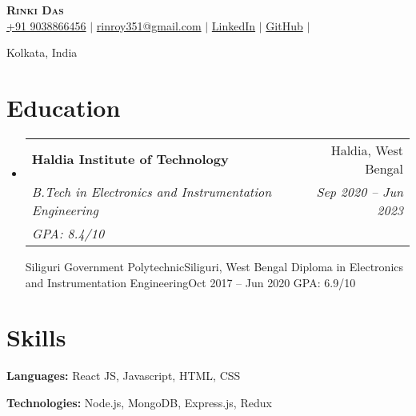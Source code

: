 \documentclass[letterpaper,11pt]{article}
\makeatletter
\newcommand{\resumeEducationHeading}[6]{
  \vspace{-2pt}\item
    \begin{tabular*}{0.97\textwidth}[t]{l@{\extracolsep{\fill}}r}
      \textbf{#1} & #2 \\
      \textit{\small#3} & \textit{\small #4} \\
      \textit{\small#5} & \textit{\small #6} \\
    \end{tabular*}\vspace{-5pt}
}
\newcommand{\resumeSubHeadingListStart}{\begin{itemize}[leftmargin=0.15in, label={}]}
\newcommand{\resumeSubHeadingListEnd}{\end{itemize}}
\makeatother
\begin{document}

\begin{center}
    \textbf{\Huge \scshape Rinki Das} \\ \vspace{3pt}
    \small
    \faMobile \hspace{.5pt} \href{tel:905314204536}{+91 9038866456}
    $|$
    \faAt \hspace{.5pt} \href{mailto:arasgungore09@gmail.com}{rinroy351@gmail.com}
    $|$
    \faLinkedinSquare \hspace{.5pt} \href{https://www.linkedin.com/in/rinki-das/}{LinkedIn}
    $|$
    \faGithub \hspace{.5pt} \href{https://github.com/rinki-das}{GitHub}
    $|$

    \faMapMarker \hspace{.5pt} Kolkata, India
\end{center}




\section{Education}
  \vspace{3pt}
  \resumeSubHeadingListStart
    
    \resumeEducationHeading
      {Haldia Institute of Technology}{Haldia, West Bengal}
      {B.Tech in Electronics and Instrumentation Engineering}{Sep 2020 -- Jun 2023}
      {GPA: 8.4/10}

    \resumeEducationHeading
      {Siliguri Government Polytechnic}{Siliguri, West Bengal}
      {Diploma in Electronics and Instrumentation Engineering}{Oct 2017 -- Jun 2020}
      {GPA: 6.9/10}

  \resumeSubHeadingListEnd







\section{Skills}
  \vspace{2pt}
  \resumeSubHeadingListStart
    \small{\item{
        
        \textbf{Languages:}{ React JS, Javascript, HTML, CSS} \\ \vspace{3pt}
        
        \textbf{Technologies:}{ Node.js, MongoDB, Express.js, Redux} \\ \vspace{3pt}
        
    }}
  \resumeSubHeadingListEnd
\end{document}
